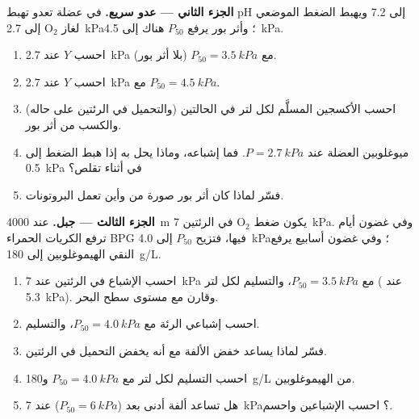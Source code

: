\begin{problem}
\medskip
\noindent\textbf{الجزء الثاني --- عدو سريع.}
في عضلة تعدو تهبط pH إلى 7.2 ويهبط الضغط الموضعي
لغاز $\mathrm{O_2}$ إلى \qty{2.7}{kPa}؛ وأثر بور يرفع $P_{50}$ هناك إلى
\qty{4.5}{kPa}.
\begin{enumerate}[resume]
  \item احسب $Y$ عند \qty{2.7}{kPa} مع $P_{50} = \qty{3.5}{kPa}$
        (بلا أثر بور).
  \item احسب $Y$ عند \qty{2.7}{kPa} مع $P_{50} = \qty{4.5}{kPa}$.
  \item احسب الأكسجين المسلَّم لكل لتر في الحالتين (والتحميل في
        الرئتين على حاله) والكسب من أثر بور.
  \item ميوغلوبين العضلة عند $P = \qty{2.7}{kPa}$. فما إشباعه، وماذا
        يحل به إذا هبط الضغط إلى \qty{0.5}{kPa} في أثناء تقلص؟
  \item فسّر لماذا كان أثر بور صورة من  وأين تعمل
        البروتونات.
\end{enumerate}

\medskip
\noindent\textbf{الجزء الثالث --- جبل.}
عند \qty{4000}{m} يكون ضغط $\mathrm{O_2}$ في الرئتين \qty{7}{kPa}.
وفي غضون أيام ترفع الكريات الحمراء BPG فيها، فتزيح $P_{50}$ إلى
\qty{4.0}{kPa}؛ وفي غضون أسابيع يرفع النقي الهيموغلوبين إلى
\qty{180}{g/L}.
\begin{enumerate}[resume]
  \item احسب الإشباع في الرئتين عند \qty{7}{kPa} مع
        $P_{50} = \qty{3.5}{kPa}$، والتسليم لكل لتر ( عند
        \qty{5.3}{kPa}). وقارن مع مستوى سطح البحر.
  \item احسب إشباعي الرئة  مع $P_{50} = \qty{4.0}{kPa}$،
        والتسليم.
  \item فسّر لماذا يساعد خفض الألفة مع أنه يخفض التحميل في الرئتين.
  \item احسب التسليم لكل لتر مع $P_{50} = \qty{4.0}{kPa}$
        و\qty{180}{g/L} من الهيموغلوبين.
  \item هل تساعد ألفة أدنى بعد ($P_{50} = \qty{6}{kPa}$) عند
        \qty{7}{kPa}؟ احسب الإشباعين واحسم.
\end{enumerate}


\end{problem}
